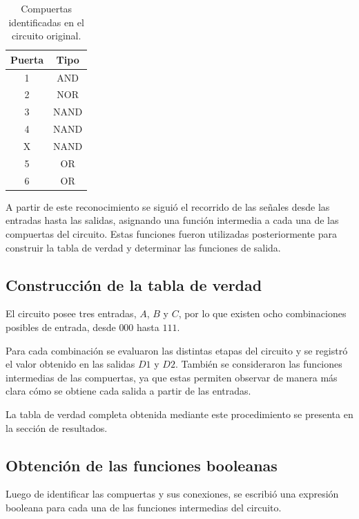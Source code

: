 \documentclass[12pt]{report}
\begin{document}
\begin{table}[H]
    \centering
    \caption{Compuertas identificadas en el circuito original.}
    \label{tab:compuertas-circuito}
    \begin{tabular}{c|c}
        \toprule
        \textbf{Puerta} & \textbf{Tipo} \\
        \midrule
        1 & AND \\
        2 & NOR \\
        3 & NAND \\
        4 & NAND \\
        X & NAND \\
        5 & OR \\
        6 & OR \\
        \bottomrule
    \end{tabular}
\end{table}

A partir de este reconocimiento se siguió el recorrido de las señales desde las
entradas hasta las salidas, asignando una función intermedia a cada una de las
compuertas del circuito. Estas funciones fueron utilizadas posteriormente para
construir la tabla de verdad y determinar las funciones de salida.


\subsection{Construcción de la tabla de verdad}

El circuito posee tres entradas, $A$, $B$ y $C$, por lo que existen ocho
combinaciones posibles de entrada, desde $000$ hasta $111$.

Para cada combinación se evaluaron las distintas etapas del circuito y se registró
el valor obtenido en las salidas $D1$ y $D2$. También se consideraron las funciones
intermedias de las compuertas, ya que estas permiten observar de manera más clara
cómo se obtiene cada salida a partir de las entradas.

La tabla de verdad completa obtenida mediante este procedimiento se presenta en la
sección de resultados.


\subsection{Obtención de las funciones booleanas}

Luego de identificar las compuertas y sus conexiones, se escribió una expresión
booleana para cada una de las funciones intermedias del circuito.
\end{document}
